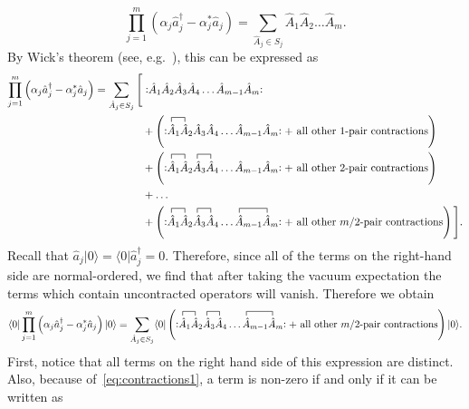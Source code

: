 \documentclass[pra,nofootinbib,floats,aps,twocolumn,tightenlines,superscriptaddress]{revtex4-1}
\newcommand{\ket}[1]{| {#1} \rangle}
\newcommand{\bra}[1]{\langle {#1} |}
\newcommand{\an}[1]{\hat{a}_{#1}}
\newcommand{\adn}[1]{\hat{a}_{#1}^\dagger}
\newcommand{\ah}{\hat{a}}
\newcommand{\normord}[1]{:\mathrel{#1}:}
\begin{document}
\begin{equation}
    \prod_{j=1}^m
    \left(\alpha_j\adn{j}
    -\alpha_j^*\an{j}\right)
    =
    \sum_{\hat{A}_j\in S_j}
    \hat{A}_1\hat{A}_2\ldots\hat{A}_m.
\end{equation}
By Wick's theorem (see, e.g.~\cite{Peskin1996}), this can be expressed as
\begin{align}
    \prod_{j=1}^m
    \left(\alpha_j\adn{j}
    -\alpha_j^*\an{j}\right)
    =
    \sum_{\hat{A}_j\in S_j}
    \Bigg[&
    \normord{\hat{A}_1\hat{A}_2\hat{A}_3\hat{A}_4\ldots\hat{A}_{m-1}\hat{A}_m}
    \notag\\
    &+
    \left(
    \normord{
    \contraction{}{\hat{A}}{{}_1}{\hat{A}}
    \hat{A}_1\hat{A}_2\hat{A}_3\hat{A}_4\ldots\hat{A}_{m-1}\hat{A}_m}
    +\text{ all other 1-pair contractions}
    \right)
    \notag\\
    &+
    \left(
    \normord{
    \contraction{}{\hat{A}}{{}_1}{\hat{A}}
    \contraction{\hat{A}_1\hat{A}_2}{\hat{A}}{{}_3}{\hat{A}}
    \hat{A}_1\hat{A}_2\hat{A}_3\hat{A}_4\ldots\hat{A}_{m-1}\hat{A}_m}
    +\text{ all other 2-pair contractions}
    \right)
    \notag\\
    &+\ldots
    \notag\\
    &+
    \left(
    \normord{
    \contraction{}{\hat{A}}{{}_1}{\hat{A}}
    \contraction{\hat{A}_1\hat{A}_2}{\hat{A}}{{}_3}{\hat{A}}
    \contraction{\hat{A}_1\hat{A}_2\hat{A}_3\hat{A}_4\ldots}{\hat{A}}{{}_{m-1}}{\hat{A}}
    \hat{A}_1\hat{A}_2\hat{A}_3\hat{A}_4\ldots\hat{A}_{m-1}\hat{A}_m}
    +\text{ all other $m/2$-pair contractions}
    \right)
    \Bigg].
\end{align}
Recall that $\ah_j\ket{0}=\bra{0}\ah_j^\dagger=0$. Therefore, since all of the terms on the right-hand side are normal-ordered, we find that after taking the vacuum expectation the terms which contain uncontracted operators will vanish. Therefore we obtain
\begin{equation}
    \bra{0}
    \prod_{j=1}^m
    \left(\alpha_j\adn{j}
    -\alpha_j^*\an{j}\right)
    \ket{0}
    =
    \sum_{\hat{A}_j\in S_j}
    \bra{0}
    \left(
    \normord{
    \contraction{}{\hat{A}}{{}_1}{\hat{A}}
    \contraction{\hat{A}_1\hat{A}_2}{\hat{A}}{{}_3}{\hat{A}}
    \contraction{\hat{A}_1\hat{A}_2\hat{A}_3\hat{A}_4\ldots}{\hat{A}}{{}_{m-1}}{\hat{A}}
    \hat{A}_1\hat{A}_2\hat{A}_3\hat{A}_4\ldots\hat{A}_{m-1}\hat{A}_m}
    +\text{ all other $m/2$-pair contractions}
    \right)
    \ket{0}.
\end{equation}
First, notice that all terms on the right hand side of this expression are distinct. Also, because of~\eqref{eq:contractions1}, a term is non-zero if and only if it can be written as
\end{document}
